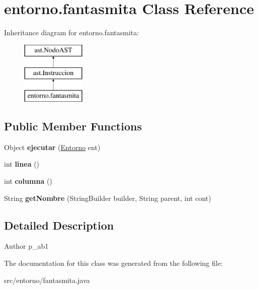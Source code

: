 \hypertarget{classentorno_1_1fantasmita}{}\section{entorno.\+fantasmita Class Reference}
\label{classentorno_1_1fantasmita}
Inheritance diagram for entorno.\+fantasmita\+:\begin{figure}[H]
\begin{center}
\leavevmode
\includegraphics[height=3.000000cm]{classentorno_1_1fantasmita}
\end{center}
\end{figure}
\subsection*{Public Member Functions}
\begin{DoxyCompactItemize}
\item 
\mbox{\label{classentorno_1_1fantasmita_a39704709c1f52ea0303d42f45f27fdf0}} 
Object {\bfseries ejecutar} (\mbox{\hyperlink{classentorno_1_1_entorno}{Entorno}} ent)
\item 
\mbox{\label{classentorno_1_1fantasmita_a951a0e24728b438e6ee39d397891c423}} 
int {\bfseries linea} ()
\item 
\mbox{\label{classentorno_1_1fantasmita_a4a79c441d99a4183defe3b8c2a624585}} 
int {\bfseries columna} ()
\item 
\mbox{\label{classentorno_1_1fantasmita_aac4bf54c18db48a4851829c729afd2fa}} 
String {\bfseries get\+Nombre} (String\+Builder builder, String parent, int cont)
\end{DoxyCompactItemize}


\subsection{Detailed Description}
\begin{DoxyAuthor}{Author}
p\+\_\+ab1 
\end{DoxyAuthor}


The documentation for this class was generated from the following file\+:\begin{DoxyCompactItemize}
\item 
src/entorno/fantasmita.\+java\end{DoxyCompactItemize}

